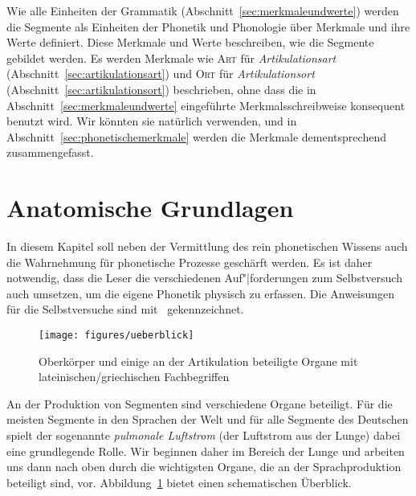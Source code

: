 
Wie alle Einheiten der Grammatik (Abschnitt~\ref{sec:merkmaleundwerte}) werden die Segmente als Einheiten der Phonetik und Phonologie über Merkmale und ihre Werte definiert.
Diese Merkmale und Werte beschreiben, wie die Segmente gebildet werden.
Es werden Merkmale wie \textsc{Art} für \textit{Artikulationsart} (Abschnitt~\ref{sec:artikulationsart}) und \textsc{Ort} für \textit{Artikulationsort} (Abschnitt~\ref{sec:artikulationsort}) beschrieben, ohne dass die in Abschnitt~\ref{sec:merkmaleundwerte} eingeführte Merkmalsschreibweise konsequent benutzt wird.
Wir könnten sie natürlich verwenden, und in Abschnitt~\ref{sec:phonetischemerkmale} werden die Merkmale dementsprechend zusammengefasst.


\section{Anatomische Grundlagen}
\label{sec:anatomischegrundlagen}

In diesem Kapitel soll neben der Vermittlung des rein phonetischen Wissens auch die Wahrnehmung für phonetische Prozesse geschärft werden.
Es ist daher notwendig, dass die Leser die verschiedenen Auf"|forderungen zum Selbstversuch auch umsetzen, um die eigene Phonetik physisch zu erfassen.
Die Anweisungen für die Selbstversuche sind mit \TuBegin\ gekennzeichnet.

\begin{figure}[!htbp]
  \centering
  \texttt{[image: figures/ueberblick]}
  \caption{Oberkörper und einige an der Artikulation beteiligte Organe mit lateinischen\slash griechischen Fachbegriffen}
  \label{fig:anatomischegrundlagen002}
\end{figure}

An der Produktion von Segmenten sind verschiedene Organe beteiligt.
Für die meisten Segmente in den Sprachen der Welt und für alle Segmente des Deutschen spielt der sogenannte \textit{pulmonale Luftstrom} (der Luftstrom aus der Lunge) dabei eine grundlegende Rolle.
Wir beginnen daher im Bereich der Lunge und arbeiten uns dann nach oben durch die wichtigsten Organe, die an der Sprachproduktion beteiligt sind, vor.
Abbildung~\ref{fig:anatomischegrundlagen002} bietet einen schematischen Überblick.

